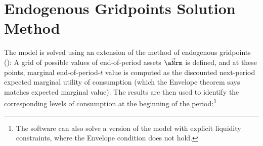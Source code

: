 \documentclass[\econtexRoot/BufferStockTheory]{subfiles}
\begin{document}
\section{Endogenous Gridpoints Solution Method}\label{sec:ApndxSolnMethEndogGpts}

The model is solved using an extension of the method of endogenous gridpoints (\cite{carroll_EGM}): A grid of possible values of end-of-period assets $\vec{\aNrm}$ is defined, and at these points, marginal end-of-period-$t$ value is computed as the discounted next-period expected marginal utility of consumption (which the Envelope theorem says matches expected marginal value).  The results are then used to identify the corresponding levels of consumption at the beginning of the period:\footnote{The software can also solve a version of the model with explicit liquidity constraints, where the Envelope condition does not hold.}

\end{document}
